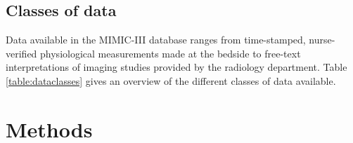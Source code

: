 \documentclass[english]{article}
\begin{document}



\subsection*{Classes of data}

Data available in the MIMIC-III database ranges from time-stamped, nurse-verified physiological measurements made at the bedside to free-text interpretations of imaging studies provided by the radiology department. Table \ref{table:dataclasses} gives an overview of the different classes of data available.

\section*{Methods}


\end{document}
